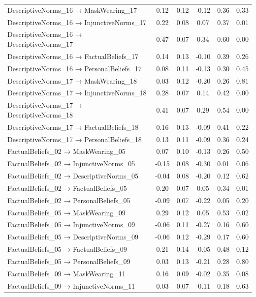 \documentclass[
  man, donotrepeattitle,floatsintext]{apa6}
\begin{document}
\begin{center}
\begin{ThreePartTable}
{\begin{longtable}{lccccc}
DescriptiveNorms\_16 → MaskWearing\_17 & 0.12 & 0.12 & -0.12 & 0.36 & 0.33\\
DescriptiveNorms\_16 → InjunctiveNorms\_17 & 0.22 & 0.08 & 0.07 & 0.37 & 0.01\\
DescriptiveNorms\_16 → DescriptiveNorms\_17 & 0.47 & 0.07 & 0.34 & 0.60 & 0.00\\
DescriptiveNorms\_16 → FactualBeliefs\_17 & 0.14 & 0.13 & -0.10 & 0.39 & 0.26\\
DescriptiveNorms\_16 → PersonalBeliefs\_17 & 0.08 & 0.11 & -0.13 & 0.30 & 0.45\\
DescriptiveNorms\_17 → MaskWearing\_18 & 0.03 & 0.12 & -0.20 & 0.26 & 0.81\\
DescriptiveNorms\_17 → InjunctiveNorms\_18 & 0.28 & 0.07 & 0.14 & 0.42 & 0.00\\
DescriptiveNorms\_17 → DescriptiveNorms\_18 & 0.41 & 0.07 & 0.29 & 0.54 & 0.00\\
DescriptiveNorms\_17 → FactualBeliefs\_18 & 0.16 & 0.13 & -0.09 & 0.41 & 0.22\\
DescriptiveNorms\_17 → PersonalBeliefs\_18 & 0.13 & 0.11 & -0.09 & 0.36 & 0.24\\
FactualBeliefs\_02 → MaskWearing\_05 & 0.07 & 0.10 & -0.13 & 0.26 & 0.50\\
FactualBeliefs\_02 → InjunctiveNorms\_05 & -0.15 & 0.08 & -0.30 & 0.01 & 0.06\\
FactualBeliefs\_02 → DescriptiveNorms\_05 & -0.04 & 0.08 & -0.20 & 0.12 & 0.62\\
FactualBeliefs\_02 → FactualBeliefs\_05 & 0.20 & 0.07 & 0.05 & 0.34 & 0.01\\
FactualBeliefs\_02 → PersonalBeliefs\_05 & -0.09 & 0.07 & -0.22 & 0.05 & 0.20\\
FactualBeliefs\_05 → MaskWearing\_09 & 0.29 & 0.12 & 0.05 & 0.53 & 0.02\\
FactualBeliefs\_05 → InjunctiveNorms\_09 & -0.06 & 0.11 & -0.27 & 0.16 & 0.60\\
FactualBeliefs\_05 → DescriptiveNorms\_09 & -0.06 & 0.12 & -0.29 & 0.17 & 0.60\\
FactualBeliefs\_05 → FactualBeliefs\_09 & 0.21 & 0.14 & -0.05 & 0.48 & 0.12\\
FactualBeliefs\_05 → PersonalBeliefs\_09 & 0.03 & 0.13 & -0.21 & 0.28 & 0.80\\
FactualBeliefs\_09 → MaskWearing\_11 & 0.16 & 0.09 & -0.02 & 0.35 & 0.08\\
FactualBeliefs\_09 → InjunctiveNorms\_11 & 0.03 & 0.07 & -0.11 & 0.18 & 0.63\\

\end{longtable}}
\end{ThreePartTable}
\end{center}
\end{document}
